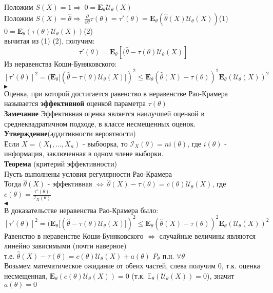 \documentclass{article}
\begin{document}
Положим $S(X)=1 \Rightarrow \ 0 = \mathbf{E}_\theta\mathcal{U}_\theta(X)$\\
Положим $S(X) = \widehat{\theta} \Rightarrow\ \frac{\partial}{\partial\theta}\tau(\theta) = \tau'(\theta) = \mathbf{E}_\theta(\widehat{\theta}(X)\mathcal{U}_\theta(X))$(1)\\
$0 = \mathbf{E}_\theta(\tau(\theta)\mathcal{U}_\theta(X))$(2)\\
вычитая из (1) (2), получим:
$$ \tau'(\theta) = \mathbf{E}_\theta[(\widehat{\theta} - \tau(\theta)\mathcal{U}_\theta(X)]$$
Из неравенства Коши-Буняковского:
$$ [\tau'(\theta)]^2 = (\mathbf{E}_\theta[(\widehat{\theta} - \tau(\theta)\mathcal{U}_\theta(X)])^2
\leq \mathbf{E}_\theta(\widehat{\theta}(X) - \tau(\theta))^2\mathbf{E}_\theta(\mathcal{U}_\theta(X))^2 $$
$\blacktriangleright$\\
Оценка, при которой достигается равенство в неравенстве Рао-Крамера называется \textbf{эффективной}
оценкой параметра $\tau(\theta)$\\
\textbf{Замечание} Эффективная оценка является наилучшей оценкой в среднеквадратичном подходе, в классе несмещенных оценок.\\
\textbf{Утверждение}(аддитивности вероятности)\\
Если $X = (X_1,\dots,X_n)$ - выбоорка, то $\mathcal{I}_X(\theta) = n i(\theta)$, где $i(\theta)$ - информация, заключенная в одном члене выборки.\\
\textbf{Теорема} (критерий эффективности)\\
Пусть выполнены условия регулярности Рао-Крамера\\
Тогда $\widehat{\theta}(X)$ - эффективная $\Leftrightarrow \ \widehat{\theta}(X) - \tau(\theta) = c(\theta)\mathcal{U}_\theta(X)$, где $c(\theta) = \frac{\tau'(\theta)}{\mathcal{I}_X(\theta)}$\\
$\blacktriangleleft$
\\
В доказательстве неравенства Рао-Крамера было:
$$ [\tau'(\theta)]^2 = (\mathbf{E}_\theta[(\widehat{\theta} - \tau(\theta)\mathcal{U}_\theta(X)])^2
\leq \mathbf{E}_\theta(\widehat{\theta}(X) - \tau(\theta))^2\mathbf{E}_\theta(\mathcal{U}_\theta(X))^2 $$
Равенство в неравенстве Коши-Буняковского $\Leftrightarrow$ случайные величины являются линейно зависимыми (почти наверное)\\
т.е. $\widehat{\theta}(X) - \tau(\theta) = c(\theta)\mathcal{U}_\theta(X) + a(\theta)$ $P_\theta$ п.н. $\forall \theta$\\
Возьмем математическое ожидание от обеих частей, слева получим 0, т.к. оценка несмещенная, $\mathbf{E}_\theta(c(\theta)\mathcal{U}_\theta(X)) = 0$ (т.к. $\mathbb{E}_\theta(\mathcal{U}_\theta(X)) = 0$), значит $a(\theta) = 0$\\
\end{document}
